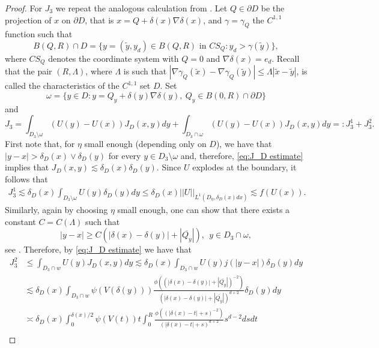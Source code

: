 \documentclass[12pt,a4paper,onecolumn]{amsart}
\theoremstyle{definition}
\newcommand{\1}{\mathbf 1}
\newcommand{\de}{\delta_D}
\newcommand{\wt}{\widetilde}
\numberwithin{equation}{section}
\begin{document}
\begin{proof}
For $J_3$ we repeat the analogous calculation from \cite[ Proposition 3.2]{semilinear_cvw}. Let $Q\in\partial D $ be the projection of $x$ on $\partial D $, that is $x=Q+\delta(x)\nabla\delta(x)$, and $\gamma=\gamma_Q$ the $ C^{1,1}$ function such that
\begin{equation*}
B(Q,R) \cap D  = \{y = (\widetilde y,y_d) \in B(Q,R) \text{ in } CS_Q : y_d > \gamma(\widetilde y)\},
\end{equation*}
where $CS_Q$ denotes the coordinate system with $Q=0$ and $\nabla\delta(x)=e_d$. Recall that the pair $(R,\Lambda)$, where $\Lambda$ is such that $|\nabla \gamma_Q(\wt x)-\nabla \gamma_Q(\wt y)|\le \Lambda |\wt x-\wt y|$, is called the characteristics of the $C^{1,1}$ set $D$. Set 
\begin{equation*}
\omega=\{y\in D:y=Q_y+\delta(y)\nabla\delta(y),\ Q_y\in B(0,R) \cap\partial D \}
\end{equation*}
and
\begin{equation*}
J_3=\int_{D_3\setminus\omega } (U(y)-U(x))J_D(x,y) dy+\int_{D_3\cap \omega} (U(y)-U(x))J_D(x,y) dy=:J_3^1+J_3^2.
\end{equation*}
First note that, for $ \eta $ small enough (depending only on $D$), we have that $|y-x| > \de(x)\vee \de (y)$ for every $y\in D_3\setminus \omega$ and, therefore, \eqref{eq:J_D estimate} implies that $J_D(x,y)\lesssim \de(x)\de(y)$. Since $U$ explodes at the boundary, it follows that
\begin{align}\label{eq:J31}
J_3^1\lesssim \de(x)\int_{D_3\setminus \omega} U(y)\de(y) dy\leq \de(x)||U||_{L^1(D_{\eta},\de(x)dx)} \lesssim f(U(x)).
\end{align}
Similarly, again by choosing $\eta$ small enough, one can show that there exists a constant $C=C(\Lambda)$ such that
\begin{equation}\label{eq:Qy}
 |y-x|\geq C(|\delta(x)-\delta(y)|+|\overline{Q_y}|), \ \ y\in D_3\cap\omega,
\end{equation}
see \cite[Eq. (3.8)]{semilinear_cvw}. Therefore, by \eqref{eq:J_D estimate} we have that
\begin{align*}
 J_3^2&\leq\int_{D_3\cap w}U(y)J_D(x,y)dy\lesssim\de(x)\int_{D_3\cap w}U(y)j(|y-x|)\de(y)dy\nonumber\\
 &\lesssim\de(x)\int_{D_3\cap w}\psi(V(\delta(y)))\frac{\phi((|\delta(x)-\delta(y)|+|\overline{Q_y}|)^{-2})}{(|\delta(x)-\delta(y)|+|\overline{Q_y}|)^{d+2}}\de(y)dy\nonumber\\
 &\asymp\de(x)\int_{0}^{\delta(x)/2}\psi(V(t))t\int_0^R\frac{\phi((|\delta(x)-t|+s)^{-2})}{(|\delta(x)-t|+s)^{d+2}}s^{d-2}dsdt\nonumber\\

\end{align*}
\end{proof}
\end{document}
